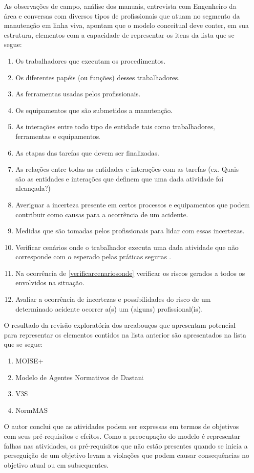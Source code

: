 As observações de campo, análise dos manuais, entrevista com Engenheiro da área e conversas com diversos tipos de profissionais que atuam no segmento da manutenção em linha viva, apontam que o modelo conceitual deve conter, em sua estrutura, elementos com a capacidade de representar os itens da lista que se segue:

\begin{enumerate}
	\item Os trabalhadores que executam os procedimentos.
	\item Os diferentes papéis (ou funções) desses trabalhadores.
	\item As ferramentas usadas pelos profissionais.
	\item Os equipamentos que são submetidos a manutenção.
	\item As interações entre todo tipo de entidade tais como trabalhadores, ferramentas e equipamentos.
	\item As etapas das tarefas que devem ser finalizadas. 
	\item As relações entre todas as entidades e interações com as tarefas (ex. Quais são as entidades e interações que definem que uma dada atividade foi alcançada?)
	\item Averiguar a incerteza presente em certos processos e equipamentos que podem contribuir como causas para a ocorrência de um acidente.
	\item Medidas que são tomadas pelos profissionais para lidar com essas incertezas.
	\item Verificar cenários onde o trabalhador executa uma dada atividade que não corresponde com o esperado pelas práticas seguras \label{verificarcenariosonde}. 
	\item Na ocorrência de \ref{verificarcenariosonde} verificar os riscos gerados a todos os envolvidos na situação.
	\item Avaliar a ocorrência de incertezas e possibilidades do risco de um determinado acidente ocorrer a(s) um (alguns) profissional(is).
\end{enumerate}

O resultado da revisão exploratória dos arcabouços que apresentam potencial para representar os elementos contidos na lista anterior são apresentados na lista que se segue:

\begin{enumerate}
	\item MOISE+ \cite{moiseframeworktwo}
	\item Modelo de Agentes Normativos de Dastani \cite{dastaniframework}
	\item V3S \cite{v3sframework} 
	\item NormMAS \cite{normas}
\end{enumerate}

O autor conclui que as atividades podem ser expressas em termos de objetivos com seus pré-requisitos e efeitos. Como a preocupação do modelo é representar falhas nas atividades, os pré-requisitos que não estão presentes quando se inicia a perseguição de um objetivo levam a violações que podem causar consequências no objetivo atual ou em subsequentes.